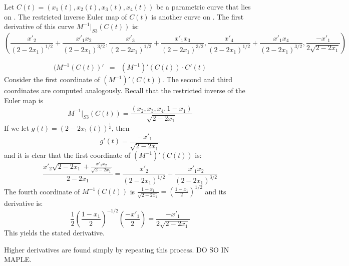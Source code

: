 \documentclass[11pt]{article}
\begin{document}
\begin{lemma}
Let $C(t) = (x_1(t),x_2(t),x_3(t),x_4(t))$ be a parametric curve that lies on .
The restricted inverse Euler map of $C(t)$ is another curve on .
The first derivative of this curve $M^{-1}|_{S3}(C(t))$ is:
\[
(\frac{x'_2}{(2-2x_1)^{1/2}} + \frac{x'_1x_2}{(2-2x_1)^{3/2}}, 
 \frac{x'_3}{(2-2x_1)^{1/2}} + \frac{x'_1x_3}{(2-2x_1)^{3/2}},
 \frac{x'_4}{(2-2x_1)^{1/2}} + \frac{x'_1x_4}{(2-2x_1)^{3/2}},
 \frac{-x'_1}{2\sqrt{2-2x_1}})
\]
\end{lemma}
\prf
\begin{eqnarray*}
(M^{-1}(C(t))' & = & (M^{-1})'(C(t)) \cdot C'(t)
\end{eqnarray*}
Consider the first coordinate of $(M^{-1})'(C(t))$.
The second and third coordinates are computed analogously.
Recall that the restricted inverse of the Euler map is
\[
M^{-1}|_{S3}(C(t)) = \frac{(x_2,x_3,x_4,1-x_1)}{\sqrt{2-2x_1}}
\]
If we let $g(t) = (2-2x_1(t))^{\frac{1}{2}}$, then
\[
g'(t) = \frac{-x'_1}{\sqrt{2-2x_1}}
\]
and it is clear that the first coordinate of $(M^{-1})'(C(t))$ is:
\[
\frac{x'_2 \sqrt{2-2x_1} + \frac{x'_1 x_2}{\sqrt{2-2x_1}}}{2-2x_1}
= \frac{x'_2}{(2-2x_1)^{1/2}} + \frac{x'_1x_2}{(2-2x_1)^{3/2}}
\]
The fourth coordinate of $M^{-1}(C(t))$ is 
$\frac{1-x_1}{\sqrt{2-2x_1}} = (\frac{1-x_1}{2})^{1/2}$
and its derivative is:
\[
\frac{1}{2} (\frac{1-x_1}{2})^{-1/2}(\frac{-x'_1}{2})
= \frac{-x'_1}{2\sqrt{2-2x_1}}
\]
This yields the stated derivative.
\QED

Higher derivatives are found simply by repeating this process. 
DO SO IN MAPLE.
\end{document}
